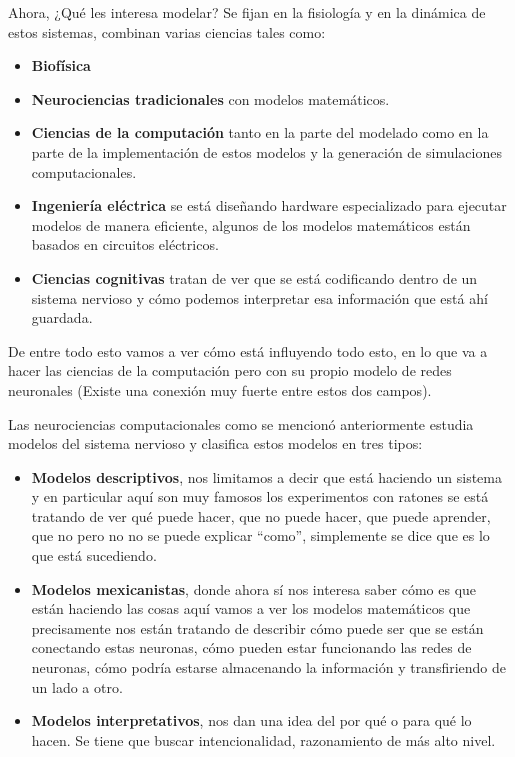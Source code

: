 Ahora, ¿Qué les interesa modelar? Se fijan en la fisiología y en la dinámica de estos sistemas, combinan varias ciencias tales como: 
\begin{itemize}
 \item  \textbf{Biofísica} 
 \item  \textbf{Neurociencias tradicionales} con modelos matemáticos. 
 \item  \textbf{Ciencias de la computación} tanto en la parte del modelado como en la parte de la implementación de estos modelos y la generación de simulaciones computacionales.
 \item  \textbf{Ingeniería eléctrica} se está diseñando hardware especializado para ejecutar modelos de manera eficiente, algunos de los modelos matemáticos están basados en circuitos eléctricos. 
 \item  \textbf{Ciencias cognitivas} tratan de ver que se está codificando dentro de un sistema nervioso y cómo podemos interpretar esa información que está ahí guardada.

\end{itemize}

De entre todo esto vamos a ver cómo está influyendo todo esto, en lo que va a hacer las ciencias de la computación pero con su propio modelo de redes neuronales (Existe una conexión muy fuerte entre estos dos campos).


Las neurociencias computacionales como se mencionó anteriormente estudia modelos del sistema nervioso y clasifica estos modelos en tres tipos: 
\begin{itemize}
 \item \textbf{Modelos descriptivos}, nos limitamos a decir que está haciendo un sistema y en particular aquí son muy famosos los experimentos con ratones se está tratando de ver qué puede hacer, que no puede hacer, que puede aprender, que no pero no no se puede explicar “como”, simplemente se dice que es lo que está sucediendo. 
 \item \textbf{Modelos mexicanistas}, donde ahora sí nos interesa saber cómo es que están haciendo las cosas aquí vamos a ver los modelos matemáticos que precisamente nos están tratando de describir cómo puede ser que se están conectando estas neuronas, cómo pueden estar funcionando las redes de neuronas, cómo podría estarse almacenando la información y transfiriendo de un lado a otro. 
 \item \textbf{Modelos interpretativos}, nos dan una idea del por qué o para qué lo hacen. Se tiene que buscar intencionalidad, razonamiento de más alto nivel.
\end{itemize}

